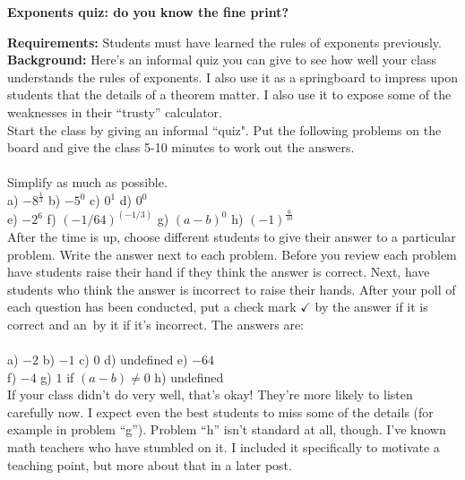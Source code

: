 \documentclass[12pt]{article}
\begin{document}
\begin{center}
  \Large{\textbf{Exponents quiz: do you know the fine print?}}
\end{center}
\textbf{Requirements:} Students must have learned the rules of exponents previously.\\
\textbf{Background:} Here's an informal quiz you can give to see
how well your class understands the rules of exponents. I also use it 
as a springboard to impress upon students that the details of a theorem matter. I also use it to expose some of the weaknesses 
in their ``trusty'' calculator.\\

Start the class by giving an informal ``quiz". Put the following problems on the board and give
the class 5-10 minutes to work out the answers.\\\\
Simplify as much as possible.\\
a) $-8^{\frac{1}{3}}$ \hspace{60pt} b) $-5^0$ \hspace{60pt} c) $0^1$ \hspace{60pt} 
d) $0^0$\\
e) $-2^6$ \hspace{64pt} f) $(-1/64)^{(-1/3)}$  \hspace{12pt} g) $(a-b)^0$
\hspace{31pt} h) $(-1)^{\frac{6}{10}}$\\

After the time is up, choose different students to give their answer to a particular problem. Write
the answer next to each problem. Before you review each problem have students raise their hand
if they think the answer is correct. Next, have students who think the answer is incorrect to 
raise their hands. After your poll of each question has been conducted, put a check mark 
$\checkmark$ by the answer if it is correct and an \texttimes \,by it if it's incorrect. The
answers are:\\\\
a) $-2$ \hspace{35pt} b) $-1$ \hspace{35pt} c) $0$ \hspace{35pt} 
d) undefined  \hspace{37pt} e) $-64$\\
f) $-4$ \hspace{37pt} g) $1$ if $(a-b) \neq 0$
\hspace{35pt} h) undefined \\

If your class didn't do very well, that's okay! They're more likely to 
listen carefully now. I expect even the best students to miss some 
of the details (for example in problem ``g''). Problem ``h'' isn't 
standard at all, though. I've known math 
teachers who have stumbled on it. I included it specifically 
to motivate a teaching point, but more about that in a later post.
\end{document}
